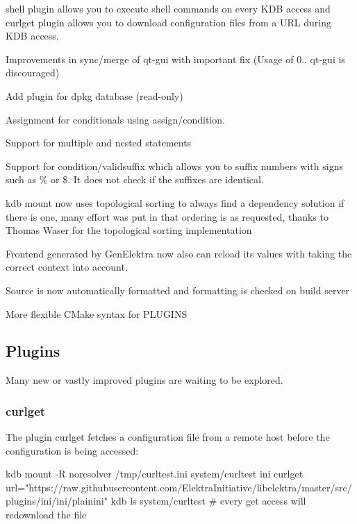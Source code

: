 \begin{DoxyItemize}
\item shell plugin allows you to execute shell commands on every K\+D\+B access and curlget plugin allows you to download configuration files from a U\+R\+L during K\+D\+B access.
\item Improvements in sync/merge of qt-\/gui with important fix (Usage of 0.. qt-\/gui is discouraged)
\item Add plugin for dpkg database (read-\/only)
\item Assignment for conditionals using {\ttfamily assign/condition}.
\item Support for multiple and nested statements
\item Support for {\ttfamily condition/validsuffix} which allows you to suffix numbers with signs such as {\ttfamily \%} or {\ttfamily \$}. It does not check if the suffixes are identical.
\item kdb mount now uses topological sorting to always find a dependency solution if there is one, many effort was put in that ordering is as requested, thanks to Thomas Waser for the topological sorting implementation
\item Frontend generated by Gen\+Elektra now also can reload its values with taking the correct context into account.
\item Source is now automatically formatted and formatting is checked on build server
\item More flexible C\+Make syntax for P\+L\+U\+G\+I\+N\+S
\end{DoxyItemize}

\subsection*{Plugins}

Many new or vastly improved plugins are waiting to be explored.

\subsubsection*{curlget}

The plugin curlget fetches a configuration file from a remote host before the configuration is being accessed\+: \begin{DoxyVerb}kdb mount -R noresolver /tmp/curltest.ini system/curltest ini curlget url="https://raw.githubusercontent.com/ElektraInitiative/libelektra/master/src/plugins/ini/ini/plainini"
kdb ls system/curltest  # every get access will redownload the file
\end{DoxyVerb}


